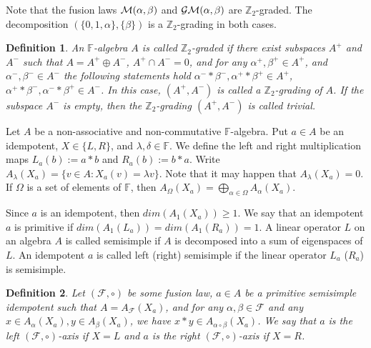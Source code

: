 \documentclass[12pt]{article}
\newcommand\F{\mathbb{F}}
\newcommand\Z{\mathbb{Z}}
\newcommand\cF{\mathcal{F}}
\newcommand\al{\alpha}
\newcommand\bt{\beta}
\newtheorem{defi}{Definition}
\begin{document}
Note that the fusion laws $\cal{M}(\al,\bt)$ and $\cal{GM}(\al,\bt)$ are $\Z_2$-graded. The decomposition $(\{0, 1, \al\}, \{\bt\})$ is a $\Z_2$-grading in both cases.

\begin{defi}
    An $\F$-algebra $A$ is called $\Z_2$-graded if there exist subspaces $A^+$ and $A^-$ such that $A=A^+\oplus A^-$, $A^+\cap A^-=0$, and for any $\alpha^+,\beta^+\in A^+$, and $\alpha^-,\beta^-\in A^-$ the following statements hold $\alpha^-*\beta^-, \alpha^+*\beta^+\in A^+$, $\alpha^+*\beta^-,\alpha^-*\beta^+\in A^-$. In this case, $(A^+,A^-)$ is called a $\Z_2$-grading of $A$. If the subspace $A^-$ is empty, then the $\Z_2$-grading $(A^+,A^-)$ is called trivial. 
\end{defi}
Let $A$ be a non-associative and non-commutative $\F$-algebra.
Put $a \in A$ be an idempotent, $X\in \{L, R\}$, and $\lambda, \delta \in \F$.
We define the left and right multiplication maps $L_a(b):=a*b$ and	$R_a(b):=b* a$. Write $A_\lambda(X_a) = \{v \in A : X_a(v) = \lambda v\}$. Note that it may happen that  
	$A_\lambda(X_a) = 0$. If $\Omega$ is a set of elements of $\F$, then $A_{\Omega}(X_a)=\bigoplus_{\alpha\in\Omega}A_{\alpha}(X_a)$.
	
	Since $a$ is an idempotent, then $dim(A_1(X_a))\geq 1$.
	We say that an idempotent $a$ is primitive if $dim(A_1(L_a))=dim(A_1(R_a))=1$. A linear operator $L$ on an algebra $A$ is called semisimple if $A$ is decomposed into a sum of eigenspaces of $L$. An idempotent $a$ is called left (right) semisimple if the linear operator $L_a$ ($R_a$) is semisimple. 

\begin{defi}



Let $(\cF,\circ)$ be some fusion law, $a\in A$ be a primitive semisimple idempotent such that $A=A_{\cF}(X_a)$, and for any $\alpha,\beta \in \cF$ and any $x\in A_{\alpha}(X_a), y\in A_{\beta}(X_a)$, we have $x* y\in A_{\alpha\circ\beta}(X_a)$. We say that $a$ is the left $(\mathcal{F},\circ)$-axis if $X=L$ and $a$ is the right $(\mathcal{F},\circ)$-axis if $X=R$.

\end{defi}	
\end{document}
